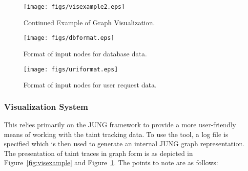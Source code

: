 \documentclass[msc,oneside]{ubcthesis}
\begin{document}
\begin{figure}[ht]
  \begin{center}
    \texttt{[image: figs/visexample2.eps]}
    \caption[Continued Example of Graph Visualization.]{\label{fig:visexample2} Continued Example of Graph Visualization.}
  \end{center}
\end{figure}

\begin{figure}[ht]
  \begin{center}
    \texttt{[image: figs/dbformat.eps]}
    \caption[Format of input nodes for database data.]{\label{fig:dbformat} Format of input nodes for database data.}
  \end{center}
\end{figure}

\begin{figure}[ht]
  \begin{center}
    \texttt{[image: figs/uriformat.eps]}
    \caption[Format of input nodes for user request data.]{\label{fig:uriformat} Format of input nodes for user request data.}
  \end{center}
\end{figure}

\subsubsection{Visualization System} 
\label{subsub:vissystem}
This relies primarily on the JUNG framework to provide a more user-friendly means of working with the taint tracking data. To use the tool, a log file is specified which is then used to generate an internal JUNG graph representation. The presentation of taint traces in graph form is as depicted in Figure~\ref{fig:visexample} and Figure~\ref{fig:visexample2}. The points to note are as follows:
\end{document}
